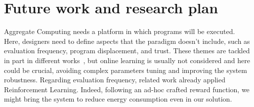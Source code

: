 \documentclass[conference]{IEEEtran}
\begin{document}
\section{Future work and research plan}
Aggregate Computing needs a platform in which programs will be executed. 
Here, designers need to define aspects that the paradigm doesn't include, 
such as evaluation frequency, program displacement, and trust. 
These themes are tackled in part in different works~\cite{DBLP:journals/scp/CasadeiAV18, DBLP:journals/fi/CasadeiPPVW20, DBLP:journals/corr/abs-2012-13806}, 
but online learning is usually not considered and here could be crucial, 
avoiding complex parameters tuning and improving the system robustness.
Regarding evaluation frequency, related work already applied Reinforcement Learning. 
Indeed, following an ad-hoc crafted reward function, we might bring the system to reduce energy 
consumption even in our solution.



\end{document}
